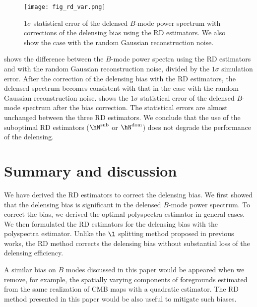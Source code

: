 \documentclass[aps,prd,twocolumn,superscriptaddress,groupedaddress,nofootinbib]{revtex4}
\begin{document}
\begin{figure}[t]
\bc
\texttt{[image: fig\_rd\_var.png]} 
\caption{
$1\sigma$ statistical error of the delensed $B$-mode power spectrum with corrections of 
the delensing bias using the RD estimators. We also show the case with the random Gaussian reconstruction noise. 
}
\label{fig:rdvar}
\ec
\end{figure}

 shows the difference between the $B$-mode power spectra using the RD estimators and with 
the random Gaussian reconstruction noise, divided by the $1\sigma$ simulation error. 
After the correction of the delensing bias with the RD estimators, 
the delensed spectrum becomes consistent with that in the case with the random Gaussian reconstruction noise.
 shows the $1\sigma$ statistical error of the delensed $B$-mode spectrum after the bias correction. 
The statistical errors are almost unchanged between the three RD estimators. 
We conclude that the use of the suboptimal RD estimators ($\hN^{\rm sub}$ or $\hN^{\rm dom}$) does not degrade 
the performance of the delensing. 

\section{Summary and discussion} \label{summary}

We have derived the RD estimators to correct the delensing bias.
We first showed that the delensing bias is significant in the delensed $B$-mode power spectrum. 
To correct the bias, we derived the optimal polyspectra estimator in general cases. 
We then formulated the RD estimators for the delensing bias with the polyspectra estimator. 
Unlike the $\l$ splitting method proposed in previous works, 
the RD method corrects the delensing bias without substantial loss of the delensing efficiency. 

A similar bias on $B$ modes discussed in this paper would be appeared when we remove, for example,  
the spatially varying components of foregrounds estimated from the same realization of CMB maps with 
a quadratic estimator. 
The RD method presented in this paper would be also useful to mitigate such biases. 
\end{document}
